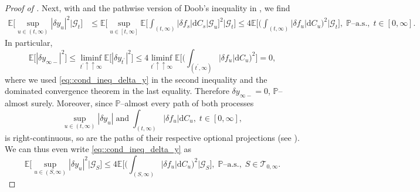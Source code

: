 \documentclass[10pt]{article} %
\newcommand\cG{\mathcal G}
\newcommand\cT{\mathcal T}
\def \E{\mathbb{E}}
\def \P{\mathbb{P}}
\def\d{\mathrm{d}}
\begin{document}
\begin{proof}[Proof of ]
\medskip
Next, with  and the pathwise version of Doob's inequality in , we find
\begin{align}\label{eq::cond_ineq_delta_y}
	\E \bigg[ \sup_{u \in (t,\infty)} |\delta y_u|^2 \bigg| \cG_t  \bigg] 
	&\leq \E \bigg[ \sup_{u \in [t,\infty]} \E \bigg[ \int_{(t,\infty)} |\delta f_s| \d C_s \bigg| \cG_u \bigg]^2 \bigg| \cG_t  \bigg] \leq 4 \E \bigg[ \bigg(\int_{(t,\infty)} |\delta f_u| \d C_u\bigg)^2 \bigg| \cG_t \bigg], \; \text{$\P$--a.s.}, \; t \in [0,\infty].
\end{align}
In particular,
\begin{equation*}
	\E\big[|\delta y_{\infty-}|^2\big]\leq \liminf_{t^\prime \uparrow\uparrow \infty} \E\big[|\delta y_{t^\prime}|^2\big] \leq 4 \liminf_{t^\prime \uparrow\uparrow \infty}\E \bigg[ \bigg(\int_{(t^\prime,\infty)} |\delta f_u| \d C_u\bigg)^2 \bigg] = 0,
\end{equation*}
where we used \eqref{eq::cond_ineq_delta_y} in the second inequality and the dominated convergence theorem in the last equality. Therefore $\delta y_{\infty-} = 0$, $\P$--almost surely. Moreover, since $\P$--almost every path of both processes
\begin{equation*}
	\sup_{u \in (t,\infty)} |\delta y_u| \; \text{and} \; \int_{(t,\infty)} |\delta f_u| \d C_u, \; t \in [0,\infty],
\end{equation*}
is right-continuous, so are the paths of their respective optional projections (see \cite[Theorem~VI.47 and Remark~VI.50.(f)]{dellacherie1982probabilities}). We can thus even write \eqref{eq::cond_ineq_delta_y} as
\begin{equation}\label{eq::cond_ineq_delta_y2}
	\E \bigg[ \sup_{u \in (S,\infty)} |\delta y_u|^2 \bigg| \cG_S  \bigg] \leq 4 \E \bigg[ \bigg(\int_{(S,\infty)} |\delta f_u| \d C_u\bigg)^2 \bigg| \cG_S \bigg], \; \text{$\P$--a.s.}, \; S \in \cT_{0,\infty}.
\end{equation}


\end{proof}
\end{document}

